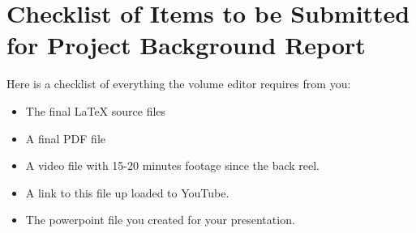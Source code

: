 \documentclass[runningheads]{llncs}
\begin{document}
\section{Checklist of Items to be Submitted for Project Background Report}
Here is a checklist of everything the volume editor requires from you:


\begin{itemize}
\settowidth{\leftmargin}{{\Large$\square$}}\advance\leftmargin{}
\itemsep8pt\relax
\renewcommand\labelitemi{{\lower1.5pt\hbox{\Large$\square$}}}

\item The final \LaTeX{} source files
\item A final PDF file
\item A video file with 15-20 minutes footage since the back reel.
\item A link to this file up loaded to YouTube.
\item The powerpoint file you created for your presentation.
\end{itemize}
\end{document}
